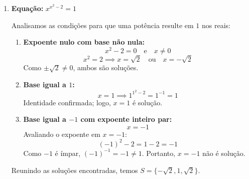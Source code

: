 \documentclass[12pt,a4paper]{report}
\begin{document}
\begin{enumerate}[label=\textbf{\arabic*.}]
	Reescrevemos a equação na forma $x^x = x^1$. Analisamos os casos no conjunto dos reais:
	\begin{enumerate}[label=\alph*)]
		\item \textbf{Expoentes iguais com base diferente de $0$, $1$ e $-1$:}
		\[
		x = 1
		\]
		Contudo, a base $x = 1$ constitui um caso próprio examinado a seguir.
		
		\item \textbf{Base igual a $1$:}
		\[
		x = 1 \implies 1^1 = 1
		\]
		Identidade confirmada; logo, $x = 1$ é solução.
		
		\item \textbf{Base igual a $0$ com expoente estritamente positivo:}
		\[
		x = 0
		\]
		Substituindo na expressão, teríamos $0^0$, que é uma indeterminação nos reais. Logo, $x = 0$ não é solução.
		
		\item \textbf{Base igual a $-1$ com expoente inteiro ímpar:}
		\[
		x = -1
		\]
		O expoente é $x = -1$, que é inteiro e ímpar:
		\[
		(-1)^{-1} = \frac{1}{(-1)^1} = -1
		\]
		A igualdade é satisfeita, confirmando que $x = -1$ é solução.
	\end{enumerate}
	Reunindo os valores válidos, obtemos $S = \{-1, 1\}$.
	
	\vspace{0.5cm}
	
	\item \textbf{Equação:} $x^{x^2-2} = 1$
	
	Analisamos as condições para que uma potência resulte em $1$ nos reais:
	\begin{enumerate}[label=\alph*)]
		\item \textbf{Expoente nulo com base não nula:}
		\[
		x^2 - 2 = 0 \quad \text{e} \quad x \neq 0
		\]
		\[
		x^2 = 2 \implies x = \sqrt{2} \quad \text{ou} \quad x = -\sqrt{2}
		\]
		Como $\pm\sqrt{2} \neq 0$, ambos são soluções.
		
		\item \textbf{Base igual a $1$:}
		\[
		x = 1 \implies 1^{1^2 - 2} = 1^{-1} = 1
		\]
		Identidade confirmada; logo, $x = 1$ é solução.
		
		\item \textbf{Base igual a $-1$ com expoente inteiro par:}
		\[
		x = -1
		\]
		Avaliando o expoente em $x = -1$:
		\[
		(-1)^2 - 2 = 1 - 2 = -1
		\]
		Como $-1$ é ímpar, $(-1)^{-1} = -1 \neq 1$. Portanto, $x = -1$ não é solução.
	\end{enumerate}
	Reunindo as soluções encontradas, temos $S = \{-\sqrt{2}, 1, \sqrt{2}\}$.
	

\end{enumerate}
\end{document}
